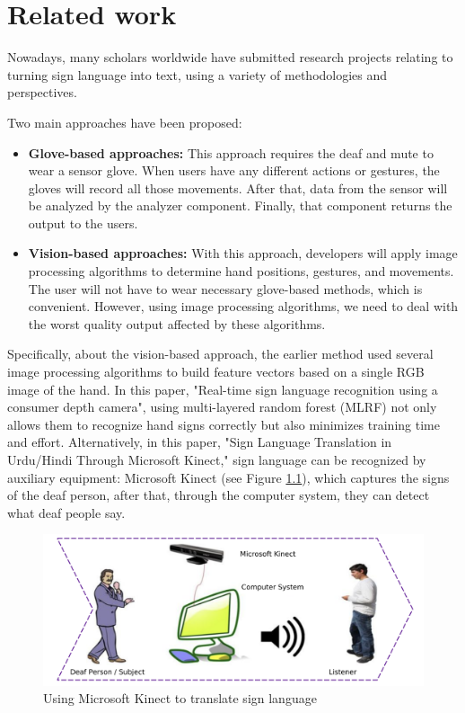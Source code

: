 \chapter{Related work}

Nowadays, many scholars worldwide have submitted research projects relating to turning sign language into text, using a variety of methodologies and perspectives.

Two main approaches have been proposed:
\begin{itemize}
  \item \textbf{Glove-based approaches:} This approach requires the deaf and mute to wear a sensor glove. When users have any different actions or gestures, the gloves will record all those movements. After that, data from the sensor will be analyzed by the analyzer component. Finally, that component returns the output to the users.
  \item \textbf{Vision-based approaches:} With this approach, developers will apply image processing algorithms to determine hand positions, gestures, and movements. The user will not have to wear necessary glove-based methods, which is convenient. However, using image processing algorithms, we need to deal with the worst quality output affected by these algorithms.
\end{itemize}

Specifically, about the vision-based approach, the earlier method used several image processing algorithms to build feature vectors based on a single RGB image of the hand. In this paper, "Real-time sign language recognition using a consumer depth camera"\cite{kuznetsova2013real}, using multi-layered random forest (MLRF) not only allows them to recognize hand signs correctly but also minimizes training time and effort. Alternatively, in this paper, "Sign Language Translation in Urdu/Hindi Through Microsoft Kinect," sign language can be recognized by auxiliary equipment: Microsoft Kinect (see Figure \ref{fig:Chap2-MS-Kinect}), which captures the signs of the deaf person, after that, through the computer system, they can detect what deaf people say.

\begin{figure}[H]
  \centering
  \includegraphics[width=\textwidth]{img/Chap2/MS-Kinect.png}
  \caption{Using Microsoft Kinect to translate sign language}
  \label{fig:Chap2-MS-Kinect}
\end{figure}

